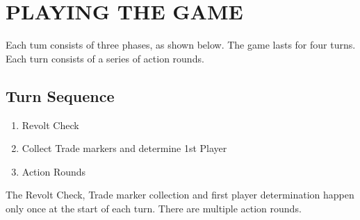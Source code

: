 \section{PLAYING THE GAME}

Each tum consists of three phases, as shown below. The game lasts for four turns. Each turn consists of a series of action rounds.

\subsection{Turn Sequence}

\begin{enumerate}[nosep]
  \item Revolt Check
  \item Collect Trade markers and determine 1st Player
  \item Action Rounds
\end{enumerate}

The Revolt Check, Trade marker collection and first player determination happen only once at the start of each turn. There are multiple action rounds.